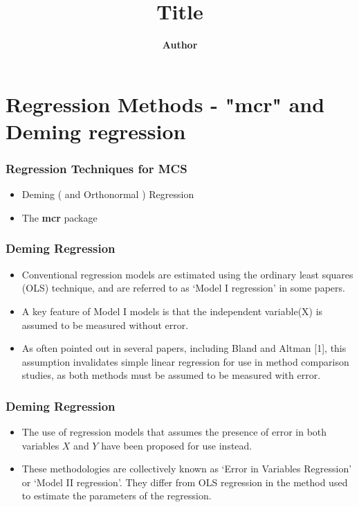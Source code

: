\documentclass[compress]{beamer}        %
\title
{
{\huge Title\\[0.3cm] }
}
\author[Kevin O'Brien]{{\bf Author}}
\institute[University of Limerick, Maths \& Stats Dept]{}
\date{}
\begin{document}
\section{Regression Methods - "mcr" and Deming regression}

\begin{frame}
\frametitle{Regression Techniques for MCS}

\Large
\begin{itemize}
\item Deming ( and Orthonormal ) Regression
\item The \textbf{mcr} package
\end{itemize}
\end{frame}

\begin{frame}
\frametitle{Deming Regression}
\begin{itemize}
\item Conventional regression models are estimated using the ordinary
least squares (OLS) technique, and are referred to as `Model I
regression' in some papers. 
\item A key feature of Model I
models is that the independent variable(X) is assumed to be measured
without error. 
\item As often pointed out in several papers, including Bland and Altman [1], this assumption invalidates simple linear
regression for use in method comparison studies, as both methods
must be assumed to be measured with error.
\end{itemize}

\end{frame}

\begin{frame}
\frametitle{Deming Regression}
\large
\begin{itemize}
\item The use of regression models that assumes the presence of error in
both variables $X$ and $Y$ have been proposed for use instead.

\item These methodologies are collectively
known as `Error in Variables Regression' or `Model II regression'. They differ from OLS regression in the method used to estimate the parameters of the regression.
 \end{itemize}

\end{frame}
\end{document}
